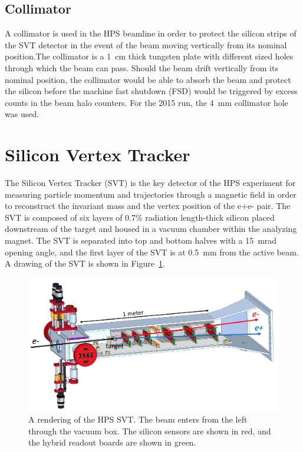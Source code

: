 \documentclass[12pt]{report}
\begin{document}
\subsection{Collimator}

A collimator is used in the HPS beamline in order to protect the silicon strips of the SVT detector in the event of the beam moving vertically from its nominal position.The collimator is a 1~cm thick tungsten plate with different sized holes through which the beam can pass. Should the beam drift vertically from its nominal position, the collimator would be able to absorb the beam and protect the silicon before the machine fast shutdown (FSD) would be triggered by excess counts in the beam halo counters. For the 2015 run, the 4~mm collimator hole was used. 

\section{Silicon Vertex Tracker}

The Silicon Vertex Tracker (SVT) is the key detector of the HPS experiment for measuring particle momentum and trajectories through a magnetic field in order to reconstruct the invariant mass and the vertex position of the e+e- pair. The SVT is composed of six layers of 0.7$\%$ radiation length-thick silicon placed downstream of the target and housed in a vacuum chamber within the analyzing magnet. The SVT is separated into top and bottom halves with a 15~mrad opening angle, and the first layer of the SVT is at 0.5~mm from the active beam. A drawing of the SVT is shown in Figure~\ref{Figure:svt}.

\begin{figure}[H]
  \centering
      \includegraphics[width=1.0\textwidth]{pics/experiment/svt.png}
  \caption[Rendering of the HPS SVT]{A rendering of the HPS SVT. The beam enters from the left through the vacuum box. The silicon sensors are shown in red, and the hybrid readout boards are shown in green.}
  \label{Figure:svt}
\end{figure}
\end{document}
